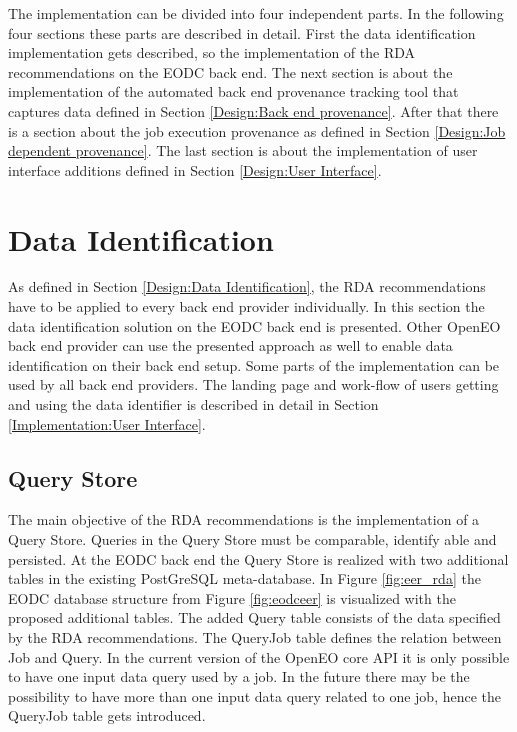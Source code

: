 \documentclass[draft,final]{vutinfth} %
\begin{document}
The implementation can be divided into four independent parts. In the following four sections these parts are described in detail. First the data identification implementation gets described, so the implementation of the RDA recommendations on the EODC back end. The next section is about the implementation of the automated back end provenance tracking tool that captures data defined in Section \ref{Design:Back end provenance}. After that there is a section about the job execution provenance as defined in Section \ref{Design:Job dependent provenance}. The last section is about the implementation of user interface additions defined in Section \ref{Design:User Interface}.     

\section{Data Identification}\label{Implementation:Data Identification}

As defined in Section \ref{Design:Data Identification}, the RDA recommendations have to be applied to every back end provider individually. In this section the data identification solution on the EODC back end is presented. Other OpenEO back end provider can use the presented approach as well to enable data identification on their back end setup. Some parts of the implementation can be used by all back end providers. The landing page and work-flow of users getting and using the data identifier is described in detail in Section \ref{Implementation:User Interface}. \\

\subsection{Query Store}
The main objective of the RDA recommendations is the implementation of a Query Store. Queries in the Query Store must be comparable, identify able and persisted. At the EODC back end the Query Store is realized with two additional tables in the existing PostGreSQL meta-database. In Figure \ref{fig:eer_rda} the EODC database structure from Figure \ref{fig:eodceer} is visualized with the proposed additional tables. The added Query table consists of the data specified by the RDA recommendations. The QueryJob table defines the relation between Job and Query. In the current version of the OpenEO core API it is only possible to have one input data query used by a job. In the future there may be the possibility to have more than one input data query related to one job, hence the QueryJob table gets introduced. 
\end{document}
